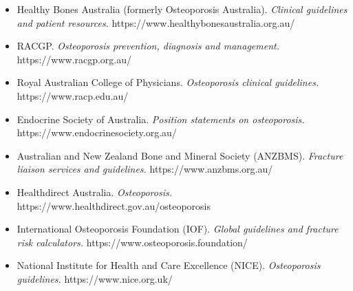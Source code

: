 \begin{itemize}
    \item Healthy Bones Australia (formerly Osteoporosis Australia). \textit{Clinical guidelines and patient resources.} https://www.healthybonesaustralia.org.au/
    \item RACGP. \textit{Osteoporosis prevention, diagnosis and management.} https://www.racgp.org.au/
    \item Royal Australian College of Physicians. \textit{Osteoporosis clinical guidelines.} https://www.racp.edu.au/
    \item Endocrine Society of Australia. \textit{Position statements on osteoporosis.} https://www.endocrinesociety.org.au/
    \item Australian and New Zealand Bone and Mineral Society (ANZBMS). \textit{Fracture liaison services and guidelines.} https://www.anzbms.org.au/
    \item Healthdirect Australia. \textit{Osteoporosis.} https://www.healthdirect.gov.au/osteoporosis
    \item International Osteoporosis Foundation (IOF). \textit{Global guidelines and fracture risk calculators.} https://www.osteoporosis.foundation/
    \item National Institute for Health and Care Excellence (NICE). \textit{Osteoporosis guidelines.} https://www.nice.org.uk/
\end{itemize}